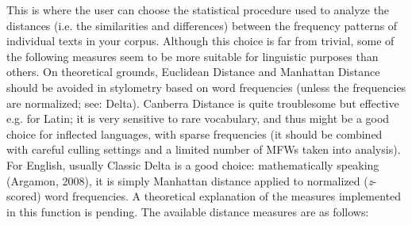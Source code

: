 \documentclass[11pt,a4paper]{article}
\def\margin#1{\marginpar{\textcolor{blue}{\footnotesize\tt #1}}}
\begin{document}
This is where the user can choose the statistical procedure used to
analyze the distances (i.e. the similarities and differences) between
the frequency patterns of individual texts in your corpus. Although
this choice is far from trivial, some of the following measures seem
to be more suitable for linguistic purposes than others. On theoretical
grounds, Euclidean Distance and Manhattan Distance should be avoided
in stylometry based on word frequencies (unless the frequencies are
normalized; see: Delta). Canberra Distance is quite troublesome but
effective e.g. for Latin; it is very sensitive to rare vocabulary,
and thus might be a good choice for inflected languages, with sparse
frequencies (it should be combined with careful culling settings and
a limited number of MFWs taken into analysis). For English, usually
Classic Delta is a good choice: mathematically speaking (Argamon,
2008), it is simply Manhattan distance applied to normalized 
(\textit{z}-scored) word frequencies. A theoretical explanation of 
the measures implemented in this function is pending. The available 
distance measures are as follows:\margin{distance.measure=}
\end{document}
